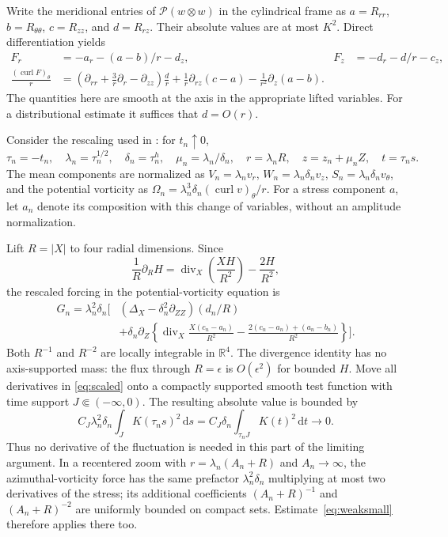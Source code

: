 \documentclass[11pt]{article}
\theoremstyle{remark}
\newcommand{\R}{\mathbb R}
\newcommand{\PP}{\mathcal P}
\newcommand{\dd}{\,\mathrm d}
\newcommand{\curl}{\operatorname{curl}}
\newcommand{\diver}{\operatorname{div}}
\begin{document}
Write the meridional entries of $\PP(w\otimes w)$ in the cylindrical
frame as $a=R_{rr}$, $b=R_{\theta\theta}$, $c=R_{zz}$, and $d=R_{rz}$.
Their absolute values are at most $K^2$. Direct differentiation yields
\begin{align}
 F_r&=-a_r-(a-b)/r-d_z,& F_z&=-d_r-d/r-c_z,\label{eq:force}\\
 \frac{(\curl F)_\theta}{r}
 &=\left(\partial_{rr}+\frac3r\partial_r-\partial_{zz}\right)\frac d r
   +\frac1r\partial_{rz}(c-a)-\frac1{r^2}\partial_z(a-b).
 \label{eq:lift}
\end{align}
The quantities here are smooth at the axis in the appropriate lifted
variables. For a distributional estimate it suffices that $d=O(r)$.

Consider the rescaling used in \cite[Section~4]{CIV}: for $t_n\uparrow0$,
\[
 \tau_n=-t_n,\quad \lambda_n=\tau_n^{1/2},\quad
 \delta_n=\tau_n^h,\quad \mu_n=\lambda_n/\delta_n,\quad
 r=\lambda_n R,\quad z=z_n+\mu_n Z,\quad t=\tau_n s.
\]
The mean components are normalized as
$V_n=\lambda_n v_r$, $W_n=\lambda_n\delta_n v_z$,
$S_n=\lambda_n\delta_n v_\theta$, and the potential vorticity as
$\Omega_n=\lambda_n^3\delta_n(\curl v)_\theta/r$.
For a stress component $a$, let $a_n$ denote its composition with this
change of variables, without an amplitude normalization.

Lift $R=|X|$ to four radial dimensions. Since
\[
 \frac1R\partial_R H
   =\diver_X\left(\frac{XH}{R^2}\right)-\frac{2H}{R^2},
\]
the rescaled forcing in the potential-vorticity equation is
\begin{equation}\label{eq:scaled}
\begin{split}
 G_n=\lambda_n^2\delta_n\bigg[&
 (\Delta_X-\delta_n^2\partial_{ZZ})(d_n/R)\\
 &+\delta_n\partial_Z\left\{
  \diver_X\frac{X(c_n-a_n)}{R^2}
  -\frac{2(c_n-a_n)+(a_n-b_n)}{R^2}\right\}\bigg].
\end{split}
\end{equation}
Both $R^{-1}$ and $R^{-2}$ are locally integrable in $\R^4$.
The divergence identity has no axis-supported mass: the flux through
$R=\epsilon$ is $O(\epsilon^2)$ for bounded $H$.
Move all derivatives in \eqref{eq:scaled} onto a compactly supported
smooth test function with time support $J\Subset(-\infty,0)$.
The resulting absolute value is bounded by
\begin{equation}\label{eq:weaksmall}
 C_J\lambda_n^2\delta_n\int_J K(\tau_n s)^2\dd s
 =C_J\delta_n\int_{\tau_nJ}K(t)^2\dd t\longrightarrow0.
\end{equation}
Thus no derivative of the fluctuation is needed in this part of the
limiting argument. In a recentered zoom with $r=\lambda_n(A_n+R)$ and
$A_n\to\infty$, the azimuthal-vorticity force has the same prefactor
$\lambda_n^2\delta_n$ multiplying at most two derivatives of the stress;
its additional coefficients $(A_n+R)^{-1}$ and $(A_n+R)^{-2}$ are
uniformly bounded on compact sets. Estimate~\eqref{eq:weaksmall}
therefore applies there too.
\end{document}
